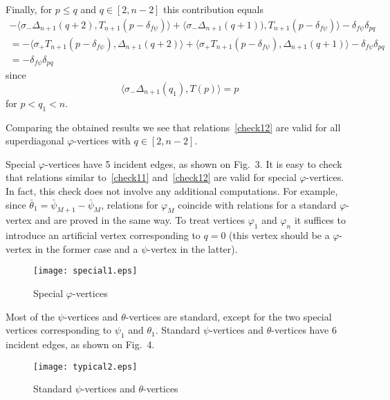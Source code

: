 \documentclass{amsart}
\theoremstyle{definition}
\theoremstyle{remark}
\numberwithin{equation}{section}
\numberwithin{theorem}{section}
\begin{document}
Finally, for $p\le q$ and $q\in [2,n-2]$ this contribution equals
\begin{equation*}
 \begin{split}
  -\langle \sigma_-\Delta_{n+1}(q+2),T_{n+1}(p-\delta_{f{{\psi}}})\rangle+
   \langle\sigma_-\Delta_{n+1}(q+1)), T_{n+1}(p-\delta_{f{{\psi}}})\rangle-\delta_{f{{\psi}}}\delta_{pq}\\
   =-\langle\sigma_+T_{n+1}(p-\delta_{f{{\psi}}}), \Delta_{n+1}(q+2)\rangle
   +\langle\sigma_+T_{n+1}(p-\delta_{f{{\psi}}}), \Delta_{n+1}(q+1)\rangle-\delta_{f{{\psi}}}\delta_{pq}\\=
   -\delta_{f{{\psi}}}\delta_{pq}
 \end{split}
 \end{equation*}
since 
$$
\langle\sigma_- \Delta_{n+1}(q_1),T(p)\rangle=p
$$
for $p<q_1<n$.

Comparing the obtained results we see that relations~\eqref{check12} are valid for all superdiagonal 
${{\varphi}}$-vertices with $q\in [2,n-2]$.

Special ${{\varphi}}$-vertices have 5 incident edges, as shown on Fig.~3. It is easy to check that relations similar 
to~\eqref{check11} and~\eqref{check12} are valid for special ${{\varphi}}$-vertices. In fact, this check does not involve
any additional computations. For example, since $\bar{{\theta}}_1=\bar{{\psi}}_{M+1}-\bar{{\psi}}_M$, relations for
${{\varphi}}_M$ coincide with relations for a standard ${{\varphi}}$-vertex and are proved in the same way. To treat vertices ${{\varphi}}_1$
and ${{\varphi}}_n$ it suffices to introduce an artificial vertex corresponding to $q=0$ (this vertex should be a ${{\varphi}}$-vertex
in the former case and a ${{\psi}}$-vertex in the latter).

\begin{figure}[ht]
\begin{center}
\texttt{[image: special1.eps]}
\caption{Special ${{\varphi}}$-vertices}
\label{fig:spec1}
\end{center}
\end{figure}

Most of the ${{\psi}}$-vertices and ${{\theta}}$-vertices are standard, except for the 
two special vertices corresponding
to ${{\psi}}_1$ and ${{\theta}}_1$.
Standard 
${{\psi}}$-vertices and ${{\theta}}$-vertices have 6 incident edges, as shown on Fig.~4. 

\begin{figure}[ht]
\begin{center}
\texttt{[image: typical2.eps]}
\caption{Standard ${{\psi}}$-vertices and ${{\theta}}$-vertices}
\label{fig:typ2}
\end{center}
\end{figure}
\end{document}
